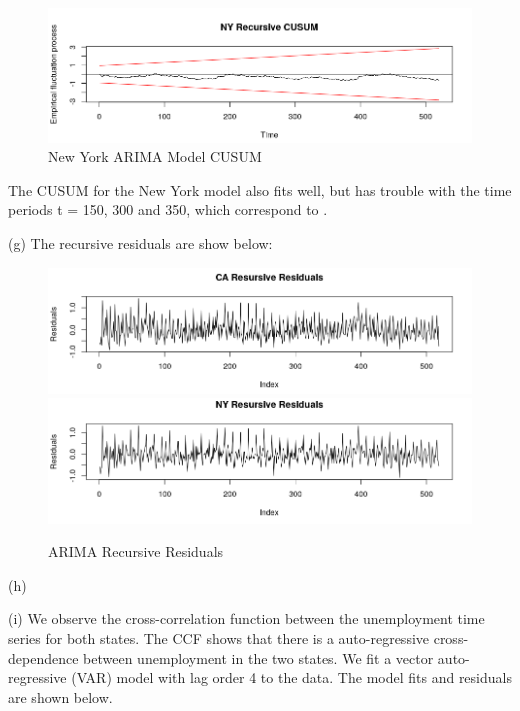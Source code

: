 \documentclass{article}
\begin{document}
\begin{figure}[H]
	
	\includegraphics[width=\linewidth]{ny_cusum}
	\caption{New York ARIMA Model CUSUM } 
\end{figure}
\noindent The CUSUM for the New York model also fits well, but has trouble with the time periods t = 150, 300 and 350, which correspond to . 


\noindent \newpage (g) The recursive residuals are show below:
\begin{figure}[H]
	
	\includegraphics[width=\linewidth]{ca_reresid}
	\includegraphics[width=\linewidth]{ny_recresid}
	\caption{ARIMA Recursive Residuals} 
\end{figure}

(h) 

(i) We observe the cross-correlation function between the unemployment time series for both states. The CCF shows that there is a auto-regressive cross-dependence between unemployment in the two states. We fit a vector auto-regressive (VAR) model with lag order 4 to the data. The model fits and residuals are shown below.
\end{document}
